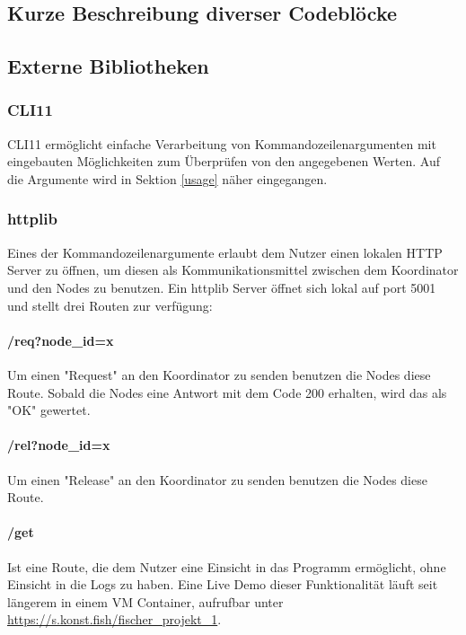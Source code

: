 \documentclass[12pt, letterpaper]{article}
\begin{document}
\subsection{Kurze Beschreibung diverser Codeblöcke}

\subsection{Externe Bibliotheken}
\label{extBib}

\subsubsection{CLI11}
CLI11\cite{cli11_ref} ermöglicht einfache Verarbeitung von Kommandozeilenargumenten mit eingebauten Möglichkeiten zum Überprüfen von den angegebenen Werten. Auf die Argumente wird in Sektion \ref{usage} näher eingegangen.

\subsubsection{httplib}
Eines der Kommandozeilenargumente erlaubt dem Nutzer einen lokalen HTTP Server zu öffnen, um diesen als Kommunikationsmittel zwischen dem Koordinator und den Nodes zu benutzen.
Ein httplib\cite{httplib-ref} Server öffnet sich lokal auf port 5001 und stellt drei Routen zur verfügung:

\paragraph{/req?node\_id=x}
Um einen "Request" an den Koordinator zu senden benutzen die Nodes diese Route. Sobald die Nodes eine Antwort mit dem Code 200 erhalten, wird das als "OK" gewertet.

\paragraph{/rel?node\_id=x}
Um einen "Release" an den Koordinator zu senden benutzen die Nodes diese Route.

\paragraph{/get}
\label{get_ref}
Ist eine Route, die dem Nutzer eine Einsicht in das Programm ermöglicht, ohne Einsicht in die Logs zu haben. Eine Live Demo dieser Funktionalität läuft seit längerem in einem VM Container, aufrufbar unter \url{https://s.konst.fish/fischer_projekt_1}.
\end{document}
